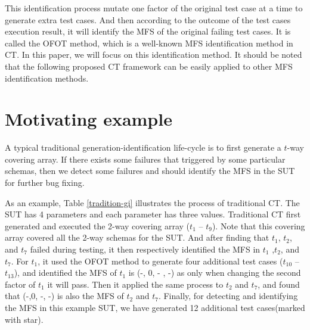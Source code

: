 \documentclass{sig-alternate}
\begin{document}
This identification process mutate one factor of the original test case at a time to generate extra test cases. And then according to the outcome of the test cases execution result, it will identify the MFS of the original failing test cases. It is called the OFOT method, which is a well-known MFS identification method in CT. In this paper, we will focus on this identification method. It should be noted that the following proposed CT framework can be easily applied to other MFS identification methods.


\section{Motivating example}

A typical traditional generation-identification life-cycle is to first generate a $t$-way covering array. If there exists some failures that triggered by some particular schemas, then we detect some failures and should identify the MFS in the SUT for further bug fixing.

As an example, Table \ref{tradition-gi} illustrates the process of traditional CT. The SUT has 4 parameters and each parameter has three values. Traditional CT first generated and executed the 2-way covering array ($t_{1}$ -- $t_{9}$). Note that this covering array covered all the 2-way schemas for the SUT. And after finding that $t_{1}$, $t_{2}$, and $t_{7}$ failed during testing, it then respectively identified the MFS in $t_{1}$ ,$t_{2}$, and $t_{7}$. For $t_{1}$, it used the OFOT method to generate four additional test cases ($t_{10}$ -- $t_{13}$), and identified the MFS of $t_{1}$ is (-, 0, - , -) as only when changing the second factor of $t_{1}$ it will pass. Then it applied the same process to $t_{2}$ and $t_{7}$, and found that (-,0, -, -) is also the MFS of $t_{2}$ and $t_{7}$.  Finally, for detecting and identifying the MFS in this example SUT, we have generated 12 additional test cases(marked with star).
\end{document}
